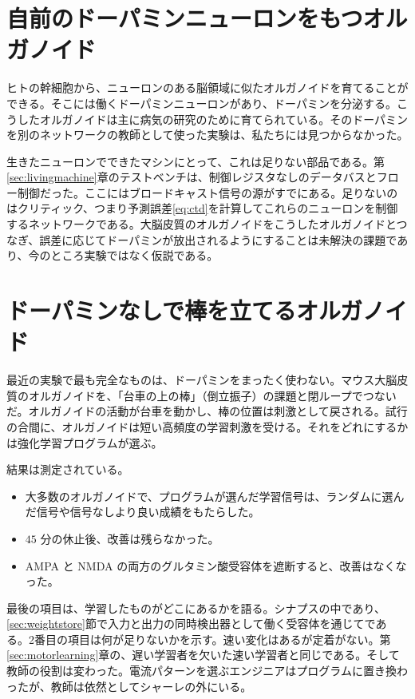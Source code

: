 \section{自前のドーパミンニューロンをもつオルガノイド}
\label{sec:midbrainorg}

ヒトの幹細胞から、ニューロンのある脳領域に似たオルガノイドを育てることができる。そこには働くドーパミンニューロンがあり、ドーパミンを分泌する\cite{Jo2016}。こうしたオルガノイドは主に病気の研究のために育てられている。そのドーパミンを別のネットワークの教師として使った実験は、私たちには見つからなかった。

生きたニューロンでできたマシンにとって、これは足りない部品である。第\ref{sec:livingmachine}章のテストベンチは、制御レジスタなしのデータバスとフロー制御だった。ここにはブロードキャスト信号の源がすでにある。足りないのはクリティック、つまり予測誤差\eqref{eq:ctd}を計算してこれらのニューロンを制御するネットワークである。大脳皮質のオルガノイドをこうしたオルガノイドとつなぎ、誤差に応じてドーパミンが放出されるようにすることは未解決の課題であり、今のところ実験ではなく仮説である。

\section{ドーパミンなしで棒を立てるオルガノイド}
\label{sec:cartpole}

最近の実験で最も完全なものは、ドーパミンをまったく使わない\cite{Robbins2026}。マウス大脳皮質のオルガノイドを、「台車の上の棒」（倒立振子）の課題と閉ループでつないだ。オルガノイドの活動が台車を動かし、棒の位置は刺激として戻される。試行の合間に、オルガノイドは短い高頻度の学習刺激を受ける。それをどれにするかは強化学習プログラムが選ぶ。

結果は測定されている。
\begin{itemize}
\item 大多数のオルガノイドで、プログラムが選んだ学習信号は、ランダムに選んだ信号や信号なしより良い成績をもたらした。
\item $45$ 分の休止後、改善は残らなかった。
\item AMPA と NMDA の両方のグルタミン酸受容体を遮断すると、改善はなくなった。
\end{itemize}

最後の項目は、学習したものがどこにあるかを語る。シナプスの中であり、\ref{sec:weightstore}節で入力と出力の同時検出器として働く受容体を通じてである。2番目の項目は何が足りないかを示す。速い変化はあるが定着がない。第\ref{sec:motorlearning}章の、遅い学習者を欠いた速い学習者と同じである。そして教師の役割は変わった。電流パターンを選ぶエンジニアはプログラムに置き換わったが、教師は依然としてシャーレの外にいる。

